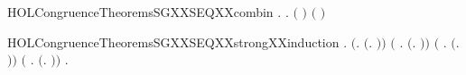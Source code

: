 \newcommand{\HOLCongruenceTheoremsSGXXrules}{\UseVerbatim{HOLCongruenceTheoremsSGXXrules}}
\begin{SaveVerbatim}{HOLCongruenceTheoremsSGXXSEQXXcombin}
\HOLTokenTurnstile{} \HOLSymConst{\HOLTokenForall{}}.   \HOLSymConst{\HOLTokenConj{}}   \HOLSymConst{\HOLTokenImp{}} \HOLSymConst{\HOLTokenForall{}}.   \HOLSymConst{\HOLTokenImp{}}  \ensuremath{(} \HOLConst{\HOLTokenCompose} \ensuremath{)} \HOLSymConst{\HOLTokenConj{}}  \ensuremath{(} \HOLConst{\HOLTokenCompose} \ensuremath{)}
\end{SaveVerbatim}
\newcommand{\HOLCongruenceTheoremsSGXXSEQXXcombin}{\UseVerbatim{HOLCongruenceTheoremsSGXXSEQXXcombin}}
\begin{SaveVerbatim}{HOLCongruenceTheoremsSGXXSEQXXstrongXXinduction}
\HOLTokenTurnstile{} \HOLSymConst{\HOLTokenForall{}}.
       \ensuremath{(}\HOLSymConst{\HOLTokenForall{}}.  \ensuremath{(}\HOLTokenLambda{}. \ensuremath{)}\ensuremath{)} \HOLSymConst{\HOLTokenConj{}} \ensuremath{(}\HOLSymConst{\HOLTokenForall{}} .   \HOLSymConst{\HOLTokenImp{}}  \ensuremath{(}\HOLTokenLambda{}.  \HOLSymConst{\ensuremath{\ldotp}} \ensuremath{)}\ensuremath{)} \HOLSymConst{\HOLTokenConj{}}
       \ensuremath{(}\HOLSymConst{\HOLTokenForall{}} .   \HOLSymConst{\HOLTokenConj{}}   \HOLSymConst{\HOLTokenConj{}}   \HOLSymConst{\HOLTokenImp{}}  \ensuremath{(}\HOLTokenLambda{}. \HOLSymConst{\ensuremath{\ldotp}} \ensuremath{)}\ensuremath{)} \HOLSymConst{\HOLTokenConj{}}
       \ensuremath{(}\HOLSymConst{\HOLTokenForall{}} .
              \HOLSymConst{\HOLTokenConj{}}   \HOLSymConst{\HOLTokenConj{}}   \HOLSymConst{\HOLTokenConj{}}   \HOLSymConst{\HOLTokenConj{}}   \HOLSymConst{\HOLTokenConj{}}   \HOLSymConst{\HOLTokenImp{}}
             \ensuremath{(}\HOLTokenLambda{}.   \HOLSymConst{\ensuremath{+}}  \ensuremath{)}\ensuremath{)} \HOLSymConst{\HOLTokenImp{}}
       \HOLSymConst{\HOLTokenForall{}}.   \HOLSymConst{\HOLTokenConj{}}   \HOLSymConst{\HOLTokenImp{}}  
\end{SaveVerbatim}
